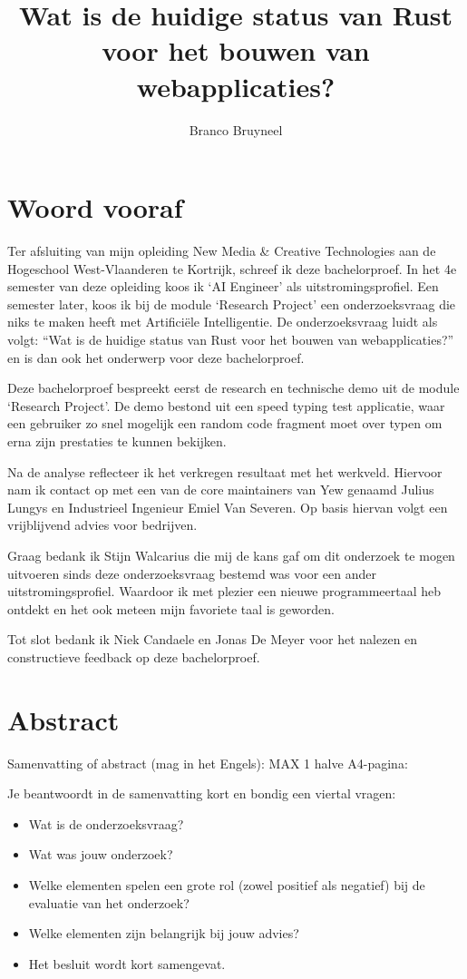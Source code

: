 \documentclass[11pt,a4paper,oneside]{book}
\author{Branco Bruyneel}
\title{Wat is de huidige status van Rust voor het bouwen van webapplicaties?}
\begin{document}
\maketitle

\chapter*{Woord vooraf}
Ter afsluiting van mijn opleiding New Media \& Creative Technologies aan de Hogeschool
West-Vlaanderen te Kortrijk, schreef ik deze bachelorproef.  In het 4e semester van deze opleiding
koos ik ‘AI Engineer’ als uitstromingsprofiel. Een semester later, koos ik bij de module ‘Research
Project’ een onderzoeksvraag die niks te maken heeft met Artificiële Intelligentie. De
onderzoeksvraag luidt als volgt: “Wat is de huidige status van Rust voor het bouwen van
webapplicaties?” en is dan ook het onderwerp voor deze bachelorproef. 

Deze bachelorproef bespreekt eerst de research en technische demo uit de module ‘Research Project’.
De demo bestond uit een speed typing test applicatie, waar een gebruiker zo snel mogelijk een random
code fragment moet over typen om erna zijn prestaties te kunnen bekijken. 

Na de analyse reflecteer ik het verkregen resultaat met het werkveld. Hiervoor nam ik contact op met
een van de core maintainers van Yew genaamd Julius Lungys en Industrieel Ingenieur Emiel Van
Severen. Op basis hiervan volgt een vrijblijvend advies voor bedrijven. 

Graag bedank ik Stijn Walcarius die mij de kans gaf om dit onderzoek te mogen uitvoeren sinds deze
onderzoeksvraag bestemd was voor een ander uitstromingsprofiel. Waardoor ik met plezier een nieuwe
programmeertaal heb ontdekt en het ook meteen mijn favoriete taal is geworden. 

Tot slot bedank ik Niek Candaele en Jonas De Meyer voor het nalezen en constructieve feedback op
deze bachelorproef.

\chapter*{Abstract}
Samenvatting of abstract (mag in het Engels): MAX 1 halve A4-pagina:  

Je beantwoordt in de samenvatting kort en bondig een viertal vragen:  
\begin{itemize}
  \item Wat is de onderzoeksvraag? 
  \item Wat was jouw onderzoek?  
  \item Welke elementen spelen een grote rol (zowel positief als negatief) bij de evaluatie van het
    onderzoek?  
  \item Welke elementen zijn belangrijk bij jouw advies? 
  \item Het besluit wordt kort samengevat.
\end{itemize}
\end{document}
